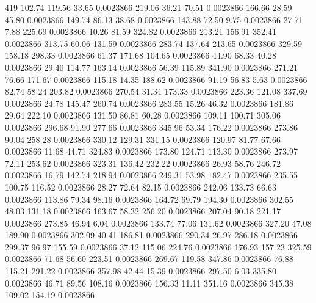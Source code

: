    419
    102.74    119.56     33.65  0.0023866
    219.06     36.21     70.51  0.0023866
    166.66     28.59     45.80  0.0023866
    149.74     86.13     38.68  0.0023866
    143.88     72.50      9.75  0.0023866
     27.71      7.88    225.69  0.0023866
     10.26     81.59    324.82  0.0023866
    213.21    156.91    352.41  0.0023866
    313.75     60.06    131.59  0.0023866
    283.74    137.64    213.65  0.0023866
    329.59    158.18    298.33  0.0023866
     61.37    171.68    104.65  0.0023866
     44.90     68.33     40.28  0.0023866
     29.40    114.77    163.14  0.0023866
     56.39    115.89    341.90  0.0023866
    271.21     76.66    171.67  0.0023866
    115.18     14.35    188.62  0.0023866
     91.19     56.83      5.63  0.0023866
     82.74     58.24    203.82  0.0023866
    270.54     31.34    173.33  0.0023866
    223.36    121.08    337.69  0.0023866
     24.78    145.47    260.74  0.0023866
    283.55     15.26     46.32  0.0023866
    181.86     29.64    222.10  0.0023866
    131.50     86.81     60.28  0.0023866
    109.11    100.71    305.06  0.0023866
    296.68     91.90    277.66  0.0023866
    345.96     53.34    176.22  0.0023866
    273.86     90.04    258.28  0.0023866
    330.12    129.31    331.15  0.0023866
    120.97     81.77     67.66  0.0023866
     11.68     44.71    324.83  0.0023866
    173.80    124.71    113.30  0.0023866
    273.97     72.11    253.62  0.0023866
    323.31    136.42    232.22  0.0023866
     26.93     58.76    246.72  0.0023866
     16.79    142.74    218.94  0.0023866
    249.31     53.98    182.47  0.0023866
    235.55    100.75    116.52  0.0023866
     28.27     72.64     82.15  0.0023866
    242.06    133.73     66.63  0.0023866
    113.86     79.34     98.16  0.0023866
    164.72     69.79    194.30  0.0023866
    302.55     48.03    131.18  0.0023866
    163.67     58.32    256.20  0.0023866
    207.04     90.18    221.17  0.0023866
    273.85     46.94      6.04  0.0023866
    133.74     77.06    131.62  0.0023866
    327.20     47.08    189.90  0.0023866
    302.09     40.41    186.81  0.0023866
    290.34     26.97    286.18  0.0023866
    299.37     96.97    155.59  0.0023866
     37.12    115.06    224.76  0.0023866
    176.93    157.23    325.59  0.0023866
     71.68     56.60    223.51  0.0023866
    269.67    119.58    347.86  0.0023866
     76.88    115.21    291.22  0.0023866
    357.98     42.44     15.39  0.0023866
    297.50      6.03    335.80  0.0023866
     46.71     89.56    108.16  0.0023866
    156.33     11.11    351.16  0.0023866
    345.38    109.02    154.19  0.0023866

